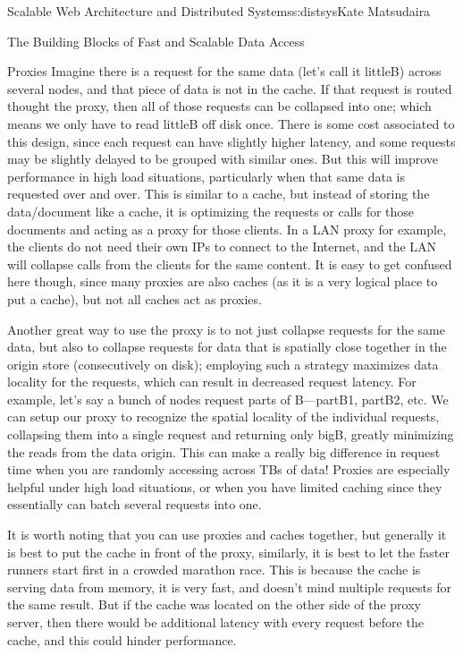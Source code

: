 \begin{aosachapter}{Scalable Web Architecture and Distributed Systems}{s:distsys}{Kate Matsudaira}
\begin{aosasect1}{The Building Blocks of Fast and Scalable Data Access}
\begin{aosasect2}{Proxies}
Imagine there is a request for the same data (let’s call it littleB)
across several nodes, and that piece of data is not in the cache. If
that request is routed thought the proxy, then all of those requests
can be collapsed into one; which means we only have to read littleB
off disk once. There is some cost associated to this design, since
each request can have slightly higher latency, and some requests may
be slightly delayed to be grouped with similar ones. But this will
improve performance in high load situations, particularly when that
same data is requested over and over. This is similar to a cache, but
instead of storing the data/document like a cache, it is optimizing
the requests or calls for those documents and acting as a proxy for
those clients. In a LAN proxy for example, the clients do not need
their own IPs to connect to the Internet, and the LAN will collapse
calls from the clients for the same content. It is easy to get
confused here though, since many proxies are also caches (as it is a
very logical place to put a cache), but not all caches act as proxies.


Another great way to use the proxy is to not just collapse requests
for the same data, but also to collapse requests for data that is
spatially close together in the origin store (consecutively on disk);
employing such a strategy maximizes data locality for the requests,
which can result in decreased request latency. For example, let’s say
a bunch of nodes request parts of B---partB1, partB2, etc. We can
setup our proxy to recognize the spatial locality of the individual
requests, collapsing them into a single request and returning only
bigB, greatly minimizing the reads from the data origin. This can make
a really big difference in request time when you are randomly
accessing across TBs of data! Proxies are especially helpful under
high load situations, or when you have limited caching since they
essentially can batch several requests into one.


It is worth noting that you can use proxies and caches together, but
generally it is best to put the cache in front of the proxy,
similarly, it is best to let the faster runners start first in a
crowded marathon race. This is because the cache is serving data from
memory, it is very fast, and doesn’t mind multiple requests for the
same result. But if the cache was located on the other side of the
proxy server, then there would be additional latency with every
request before the cache, and this could hinder performance.


\end{aosasect2}
\end{aosasect1}
\end{aosachapter}
